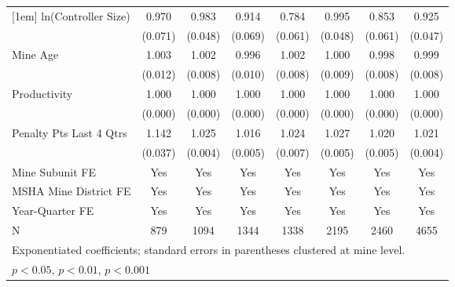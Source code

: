 {\begin{tabular}{l*{7}{c}}
[1em]
ln(Controller Size)      &       0.970         &       0.983         &       0.914         &       0.784\sym{**} &       0.995         &       0.853\sym{*}  &       0.925         \\
                         &     (0.071)         &     (0.048)         &     (0.069)         &     (0.061)         &     (0.048)         &     (0.061)         &     (0.047)         \\
[1em]
Mine Age                 &       1.003         &       1.002         &       0.996         &       1.002         &       1.000         &       0.998         &       0.999         \\
                         &     (0.012)         &     (0.008)         &     (0.010)         &     (0.008)         &     (0.009)         &     (0.008)         &     (0.008)         \\
[1em]
Productivity             &       1.000         &       1.000         &       1.000         &       1.000         &       1.000         &       1.000         &       1.000         \\
                         &     (0.000)         &     (0.000)         &     (0.000)         &     (0.000)         &     (0.000)         &     (0.000)         &     (0.000)         \\
[1em]
Penalty Pts Last 4 Qtrs  &       1.142\sym{***}&       1.025\sym{***}&       1.016\sym{**} &       1.024\sym{***}&       1.027\sym{***}&       1.020\sym{***}&       1.021\sym{***}\\
                         &     (0.037)         &     (0.004)         &     (0.005)         &     (0.007)         &     (0.005)         &     (0.005)         &     (0.004)         \\
[1em]
Mine Subunit FE          &         Yes         &         Yes         &         Yes         &         Yes         &         Yes         &         Yes         &         Yes         \\
[1em]
MSHA Mine District FE    &         Yes         &         Yes         &         Yes         &         Yes         &         Yes         &         Yes         &         Yes         \\
[1em]
Year-Quarter FE          &         Yes         &         Yes         &         Yes         &         Yes         &         Yes         &         Yes         &         Yes         \\
\hline
N                        &         879         &        1094         &        1344         &        1338         &        2195         &        2460         &        4655         \\
\hline\hline
\multicolumn{8}{l}{\footnotesize Exponentiated coefficients; standard errors in parentheses clustered at mine level.}\\
\multicolumn{8}{l}{\footnotesize \sym{*} \(p<0.05\), \sym{**} \(p<0.01\), \sym{***} \(p<0.001\)}\\
\end{tabular}
}
